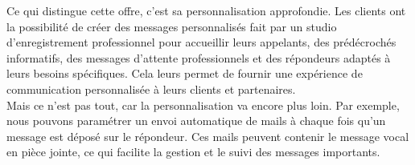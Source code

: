 \documentclass[12pt, a4paper]{article}
\begin{document}
Ce qui distingue cette offre, c'est sa
personnalisation approfondie. Les clients ont
la possibilité de créer des messages personnalisés 
fait par un studio d'enregistrement professionnel 
pour accueillir leurs appelants, des prédécrochés
informatifs, des messages d'attente professionnels
et des répondeurs adaptés à leurs besoins spécifiques.
Cela leurs permet de fournir une expérience de
communication personnalisée à leurs clients
et partenaires.\\

Mais ce n'est pas tout, car la personnalisation
va encore plus loin. Par exemple, nous
pouvons paramétrer un envoi automatique de
mails à chaque fois qu'un message est déposé sur
le répondeur. Ces mails peuvent contenir le
message vocal en pièce jointe, ce qui
facilite la gestion et le suivi des messages importants.\\
\end{document}
